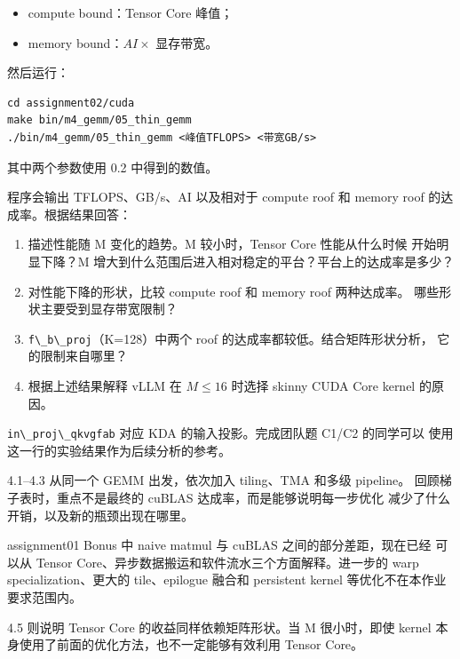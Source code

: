 \documentclass[11pt,a4paper,fontset=none]{ctexart}
\providecommand{\tightlist}{\setlength{\itemsep}{0pt}\setlength{\parskip}{0pt}}
\providecommand{\passthrough}[1]{#1}
\begin{document}
\begin{itemize}
\tightlist
\item
  compute bound：Tensor Core 峰值；
\item
  memory bound：\(AI \times\) 显存带宽。
\end{itemize}

然后运行：

\begin{lstlisting}
cd assignment02/cuda
make bin/m4_gemm/05_thin_gemm
./bin/m4_gemm/05_thin_gemm <峰值TFLOPS> <带宽GB/s>
\end{lstlisting}

其中两个参数使用 0.2 中得到的数值。

程序会输出 TFLOPS、GB/s、AI 以及相对于 compute roof 和 memory roof
的达成率。根据结果回答：

\begin{enumerate}
\def\labelenumi{(\alph{enumi})}
\item
  描述性能随 M 变化的趋势。M 较小时，Tensor Core 性能从什么时候
  开始明显下降？M
  增大到什么范围后进入相对稳定的平台？平台上的达成率是多少？
\item
  对性能下降的形状，比较 compute roof 和 memory roof 两种达成率。
  哪些形状主要受到显存带宽限制？
\item
  \passthrough{\lstinline!f\_b\_proj!}（K=128）中两个 roof
  的达成率都较低。结合矩阵形状分析， 它的限制来自哪里？
\item
  根据上述结果解释 vLLM 在 \(M \le 16\) 时选择 skinny CUDA Core kernel
  的原因。
\end{enumerate}

\passthrough{\lstinline!in\_proj\_qkvgfab!} 对应 KDA
的输入投影。完成团队题 C1/C2 的同学可以
使用这一行的实验结果作为后续分析的参考。

\begin{lookback}

4.1--4.3 从同一个 GEMM 出发，依次加入 tiling、TMA 和多级 pipeline。
回顾梯子表时，重点不是最终的 cuBLAS 达成率，而是能够说明每一步优化
减少了什么开销，以及新的瓶颈出现在哪里。

assignment01 Bonus 中 naive matmul 与 cuBLAS 之间的部分差距，现在已经
可以从 Tensor Core、异步数据搬运和软件流水三个方面解释。进一步的 warp
specialization、更大的 tile、epilogue 融合和 persistent kernel
等优化不在本作业要求范围内。

4.5 则说明 Tensor Core 的收益同样依赖矩阵形状。当 M 很小时，即使 kernel
本身使用了前面的优化方法，也不一定能够有效利用 Tensor Core。

\end{lookback}
\end{document}
